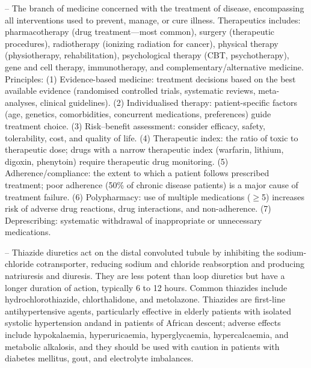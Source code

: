 -- The branch of medicine concerned with the treatment of disease, encompassing all interventions used to prevent, manage, or cure illness. Therapeutics includes: pharmacotherapy (drug treatment—most common), surgery (therapeutic procedures), radiotherapy (ionizing radiation for cancer), physical therapy (physiotherapy, rehabilitation), psychological therapy (CBT, psychotherapy), gene and cell therapy, immunotherapy, and complementary/alternative medicine. Principles: (1) Evidence-based medicine: treatment decisions based on the best available evidence (randomised controlled trials, systematic reviews, meta-analyses, clinical guidelines). (2) Individualised therapy: patient-specific factors (age, genetics, comorbidities, concurrent medications, preferences) guide treatment choice. (3) Risk–benefit assessment: consider efficacy, safety, tolerability, cost, and quality of life. (4) Therapeutic index: the ratio of toxic to therapeutic dose; drugs with a narrow therapeutic index (warfarin, lithium, digoxin, phenytoin) require therapeutic drug monitoring. (5) Adherence/compliance: the extent to which a patient follows prescribed treatment; poor adherence (50\% of chronic disease patients) is a major cause of treatment failure. (6) Polypharmacy: use of multiple medications (\(\ge\)5) increases risk of adverse drug reactions, drug interactions, and non-adherence. (7) Deprescribing: systematic withdrawal of inappropriate or unnecessary medications.

-- Thiazide diuretics act on the distal convoluted tubule by inhibiting the sodium-chloride cotransporter, reducing sodium and chloride reabsorption and producing natriuresis and diuresis. They are less potent than loop diuretics but have a longer duration of action, typically 6 to 12 hours. Common thiazides include hydrochlorothiazide, chlorthalidone, and metolazone. Thiazides are first-line antihypertensive agents, particularly effective in elderly patients with isolated systolic hypertension andand in patients of African descent; adverse effects include hypokalaemia, hyperuricaemia, hyperglycaemia, hypercalcaemia, and metabolic alkalosis, and they should be used with caution in patients with diabetes mellitus, gout, and electrolyte imbalances.

